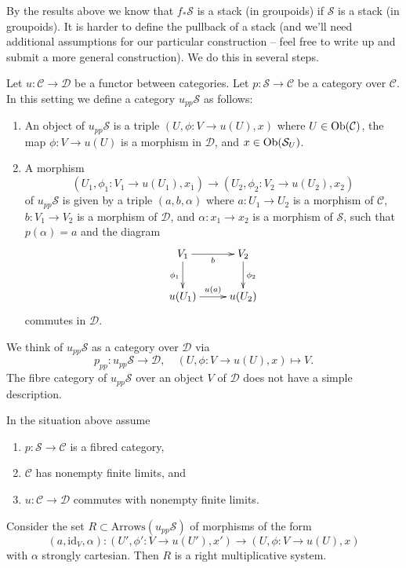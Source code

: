 \noindent
By the results above we know that $f_*\mathcal{S}$ is a stack (in groupoids)
if $\mathcal{S}$ is a stack (in groupoids).
It is harder to define the pullback of a stack (and we'll need additional
assumptions for our particular construction -- feel free to write up and
submit a more general construction). We do this in several steps.

\medskip\noindent
Let $u : \mathcal{C} \to \mathcal{D}$ be a functor between categories.
Let $p : \mathcal{S} \to \mathcal{C}$ be a category over $\mathcal{C}$.
In this setting we define a category $u_{pp}\mathcal{S}$ as follows:
\begin{enumerate}
\item An object of $u_{pp}\mathcal{S}$ is a triple
$(U, \phi : V \to u(U), x)$ where $U \in \mathop{\mathrm{Ob}}\nolimits(\mathcal{C})$,
the map $\phi : V \to u(U)$ is a morphism in $\mathcal{D}$,
and $x \in \mathop{\mathrm{Ob}}\nolimits(\mathcal{S}_U)$.
\item A morphism
$$
(U_1, \phi_1 : V_1 \to u(U_1), x_1)
\longrightarrow
(U_2, \phi_2 : V_2 \to u(U_2), x_2)
$$
of $u_{pp}\mathcal{S}$ is given by a triple
$(a, b, \alpha)$ where $a : U_1 \to U_2$ is a morphism of $\mathcal{C}$,
$b : V_1 \to V_2$ is a morphism of $\mathcal{D}$, and
$\alpha : x_1 \to x_2$ is a morphism of $\mathcal{S}$,
such that $p(\alpha) = a$ and the diagram
$$
\xymatrix{
V_1 \ar[d]_{\phi_1} \ar[r]_b & V_2 \ar[d]^{\phi_2} \\
u(U_1) \ar[r]^{u(a)} & u(U_2)
}
$$
commutes in $\mathcal{D}$.
\end{enumerate}
We think of $u_{pp}\mathcal{S}$ as a category over $\mathcal{D}$ via
$$
p_{pp} : u_{pp}\mathcal{S} \longrightarrow \mathcal{D},
\quad
(U, \phi : V \to u(U), x) \longmapsto V.
$$
The fibre category of $u_{pp}\mathcal{S}$ over an object $V$ of $\mathcal{D}$
does not have a simple description.

\begin{lemma}
\label{lemma-right-multiplicative-system}
In the situation above assume
\begin{enumerate}
\item $p : \mathcal{S} \to \mathcal{C}$ is a fibred category,
\item $\mathcal{C}$ has nonempty finite limits, and
\item $u : \mathcal{C} \to \mathcal{D}$ commutes with nonempty finite limits.
\end{enumerate}
Consider the set $R \subset \text{Arrows}(u_{pp}\mathcal{S})$ of morphisms
of the form
$$
(a, \text{id}_V, \alpha) :
(U', \phi' : V \to u(U'), x')
\longrightarrow
(U, \phi : V \to u(U), x)
$$
with $\alpha$ strongly cartesian. Then $R$ is a right multiplicative system.
\end{lemma}


